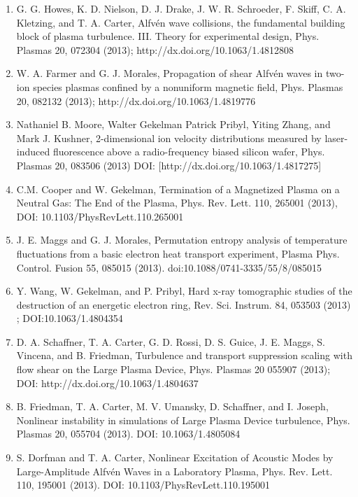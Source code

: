 \documentclass[11pt]{article}
\begin{document}
\begin{enumerate}
\item  G. G. Howes, K. D. Nielson, D. J. Drake, J. W. R. Schroeder, F. Skiff, C. A. Kletzing, and T. A. Carter, Alfv\'{e}n wave collisions, the fundamental building block of plasma turbulence. III. Theory for experimental design, Phys. Plasmas 20, 072304 (2013); http://dx.doi.org/10.1063/1.4812808

\item  W. A. Farmer and G. J. Morales, Propagation of shear Alfv\'{e}n waves in two-ion species plasmas confined by a nonuniform magnetic field, Phys. Plasmas 20, 082132 (2013); http://dx.doi.org/10.1063/1.4819776

\item   Nathaniel B. Moore, Walter Gekelman Patrick Pribyl, Yiting Zhang, and Mark J. Kushner, 2-dimensional ion velocity distributions measured by laser-induced fluorescence above a radio-frequency biased silicon wafer, Phys. Plasmas  20, 083506 (2013) DOI: [http://dx.doi.org/10.1063/1.4817275]

\item  C.M. Cooper and W. Gekelman, Termination of a Magnetized Plasma on a Neutral Gas: The End of the Plasma, Phys. Rev. Lett. 110, 265001 (2013), DOI: 10.1103/PhysRevLett.110.265001

\item   J. E. Maggs and G. J. Morales, Permutation entropy analysis of temperature fluctuations from a basic electron heat transport experiment, Plasma Phys. Control. Fusion 55, 085015 (2013). doi:10.1088/0741-3335/55/8/085015

\item  Y. Wang, W. Gekelman, and P. Pribyl, Hard x-ray tomographic studies of the destruction of an energetic electron ring, Rev. Sci. Instrum. 84, 053503 (2013) ; DOI:10.1063/1.4804354

\item   D. A. Schaffner, T. A. Carter, G. D. Rossi, D. S. Guice, J. E. Maggs, S. Vincena, and B. Friedman, Turbulence and transport suppression scaling with flow shear on the Large Plasma Device, Phys. Plasmas 20 055907 (2013); DOI: http://dx.doi.org/10.1063/1.4804637

\item   B. Friedman, T. A. Carter, M. V. Umansky, D. Schaffner, and I. Joseph, Nonlinear instability in simulations of Large Plasma Device turbulence, Phys. Plasmas 20, 055704 (2013). DOI: 10.1063/1.4805084

\item  S. Dorfman and T. A. Carter, Nonlinear Excitation of Acoustic Modes by Large-Amplitude Alfv\'{e}n Waves in a Laboratory Plasma, Phys. Rev. Lett. 110, 195001 (2013). DOI: 10.1103/PhysRevLett.110.195001


\end{enumerate}
\end{document}
